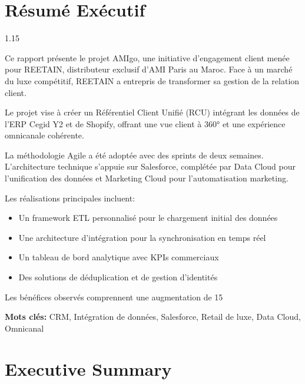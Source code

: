 \documentclass[12pt,a4paper,openany,oneside,draft]{report}
\begin{document}
\chapter*{Résumé Exécutif}
\thispagestyle{plain}

\begin{spacing}{1.15}
\normalsize

Ce rapport présente le projet AMIgo, une initiative d'engagement client menée pour REETAIN, distributeur exclusif d'AMI Paris au Maroc. Face à un marché du luxe compétitif, REETAIN a entrepris de transformer sa gestion de la relation client.

Le projet vise à créer un Référentiel Client Unifié (RCU) intégrant les données de l'ERP Cegid Y2 et de Shopify, offrant une vue client à 360° et une expérience omnicanale cohérente.

La méthodologie Agile a été adoptée avec des sprints de deux semaines. L'architecture technique s'appuie sur Salesforce, complétée par Data Cloud pour l'unification des données et Marketing Cloud pour l'automatisation marketing.

Les réalisations principales incluent:
\begin{itemize}\itemsep0em
  \item Un framework ETL personnalisé pour le chargement initial des données
  \item Une architecture d'intégration pour la synchronisation en temps réel
  \item Un tableau de bord analytique avec KPIs commerciaux
  \item Des solutions de déduplication et de gestion d'identités
\end{itemize}

Les bénéfices observés comprennent une augmentation de 15%

\end{spacing}

\vspace{0.5cm}
\noindent\textbf{Mots clés:} CRM, Intégration de données, Salesforce, Retail de luxe, Data Cloud, Omnicanal

\chapter*{Executive Summary}
\thispagestyle{plain}
\end{document}
